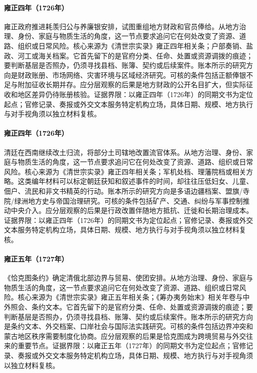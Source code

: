 \hypertarget{social:EQ-1726-HAOXIAN-GUIGONG}{}\paragraph{雍正四年（1726年）}雍正政府推进耗羡归公与养廉银安排，试图重组地方财政和官员俸给。从地方治理、身份、家庭与物质生活的角度，这一节点要求追问它在何处改变了资源、道路、组织或日常风险。核心来源为《清世宗实录》雍正四年相关条；户部奏销、盐政、河工或海关档案。它首先留下的是官府分类、任命、处置或资源调拨的痕迹；要判断基层是否照办，仍须寻找县档、账簿、契约或后续案件。账本所示的研究方向是财政账册、市场网络、灾害环境与区域经济研究。可核的条件包括正额俸银不足与附加征收长期并存。应分层观察的后果是地方财政的公开名目扩大，但实际征收和地区差异仍待账册核验。证据界限：以雍正四年（1726年）的同期文书为定位起点；官修记录、奏报或外交文本服务特定机构立场，具体日期、规模、地方执行与对手视角须以独立材料复核。
\hypertarget{social:EQ-1726-Gaitu-Guiliu-SOUTHWEST}{}\paragraph{雍正四年（1726年）}清廷在西南继续改土归流，将部分土司辖地改置流官体系。从地方治理、身份、家庭与物质生活的角度，这一节点要求追问它在何处改变了资源、道路、组织或日常风险。核心来源为《清世宗实录》雍正四年相关条；军机处档、理藩院档或相关方略。这类编年材料可以标定朝廷获知和叙述事件的时间，却往往压低妇女、儿童、佃户、流民和非文书精英的行动。账本所示的研究方向是多语边疆档案、盟旗/寺院/绿洲地方史与帝国治理研究。可核的条件包括矿产、交通、纠纷与军事控制推动中央介入。应分层观察的后果是行政改置伴随地方抵抗、迁徙和长期治理成本。证据界限：以雍正四年（1726年）的同期文书为定位起点；官修记录、奏报或外交文本服务特定机构立场，具体日期、规模、地方执行与对手视角须以独立材料复核。
\hypertarget{social:EQ-1727-KYAKHTA-TREATY}{}\paragraph{雍正五年（1727年）}《恰克图条约》确定清俄北部边界与贸易、使团安排。从地方治理、身份、家庭与物质生活的角度，这一节点要求追问它在何处改变了资源、道路、组织或日常风险。核心来源为《清世宗实录》雍正五年相关条；《筹办夷务始末》相关年卷与中外照会、条约文本。它首先留下的是官府分类、任命、处置或资源调拨的痕迹；要判断基层是否照办，仍须寻找县档、账簿、契约或后续案件。账本所示的研究方向是条约文本、外交档案、口岸社会与国际法实践研究。可核的条件包括边界冲突和蒙古地区秩序需要制度化协商。应分层观察的后果是恰克图成为跨境贸易与外交往来的重要节点。证据界限：以雍正五年（1727年）的同期文书为定位起点；官修记录、奏报或外交文本服务特定机构立场，具体日期、规模、地方执行与对手视角须以独立材料复核。

